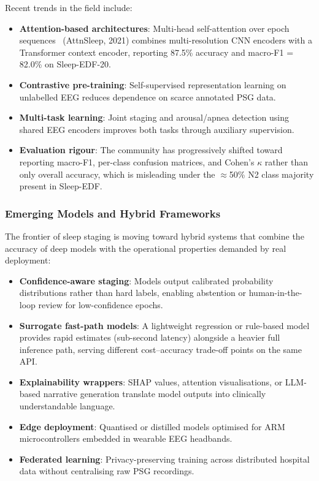 \documentclass[10pt]{article}
\begin{document}
Recent trends in the field include:
\begin{itemize}
  \item \textbf{Attention-based architectures}: Multi-head self-attention over epoch sequences~\cite{eldele2021attention} (AttnSleep, 2021) combines multi-resolution CNN encoders with a Transformer context encoder, reporting 87.5\% accuracy and macro-F1 = 82.0\% on Sleep-EDF-20.
  \item \textbf{Contrastive pre-training}: Self-supervised representation learning on unlabelled EEG reduces dependence on scarce annotated PSG data.
  \item \textbf{Multi-task learning}: Joint staging and arousal/apnea detection using shared EEG encoders improves both tasks through auxiliary supervision.
  \item \textbf{Evaluation rigour}: The community has progressively shifted toward reporting macro-F1, per-class confusion matrices, and Cohen's $\kappa$ rather than only overall accuracy, which is misleading under the $\approx$50\% N2 class majority present in Sleep-EDF.
\end{itemize}

\subsubsection{Emerging Models and Hybrid Frameworks}
\label{sec:emerging}

The frontier of sleep staging is moving toward hybrid systems that combine the accuracy of deep models with the operational properties demanded by real deployment:

\begin{itemize}
  \item \textbf{Confidence-aware staging}: Models output calibrated probability distributions rather than hard labels, enabling abstention or human-in-the-loop review for low-confidence epochs.
  \item \textbf{Surrogate fast-path models}: A lightweight regression or rule-based model provides rapid estimates (sub-second latency) alongside a heavier full inference path, serving different cost--accuracy trade-off points on the same API.
  \item \textbf{Explainability wrappers}: SHAP values, attention visualisations, or LLM-based narrative generation translate model outputs into clinically understandable language.
  \item \textbf{Edge deployment}: Quantised or distilled models optimised for ARM microcontrollers embedded in wearable EEG headbands.
  \item \textbf{Federated learning}: Privacy-preserving training across distributed hospital data without centralising raw PSG recordings.
\end{itemize}
\end{document}
